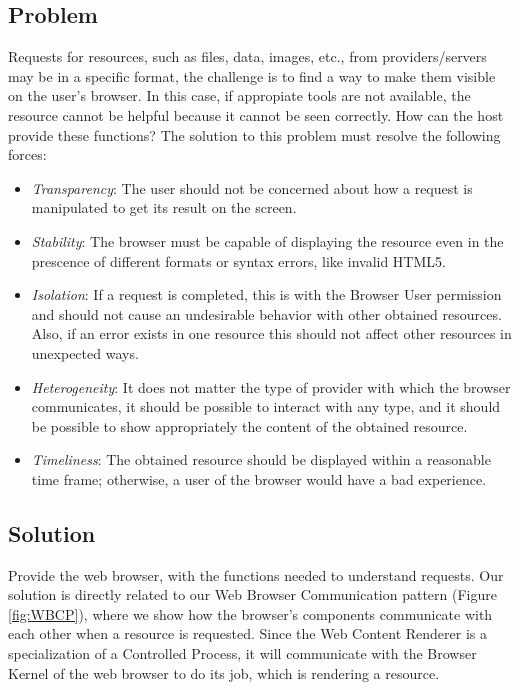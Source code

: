 \documentclass[prodmode,acmtecs]{acmsmall}
\begin{document}
  \subsection*{Problem}
  Requests for resources, such as files, data, images, etc., from providers/servers may be in a specific format, the challenge is to find a way to make them visible on the user's browser. In this case, if appropiate tools are not available, the resource cannot be helpful because it cannot be seen correctly. How can the host provide these functions? The solution to this problem must resolve the following forces:
  \begin{itemize}\leftskip0.8em
    \item \textit{Transparency}: The user should not be concerned about how a request is manipulated to get its result on the screen.
    \item \textit{Stability}: The browser must be capable of displaying the resource even in the prescence of different formats or syntax errors, like invalid HTML5.
    \item \textit{Isolation}: If a request is completed, this is with the Browser User permission and should not cause an undesirable behavior with other obtained resources. Also, if an error exists in one resource this should not affect other resources in unexpected ways.
    \item \textit{Heterogeneity}: It does not matter the type of provider with which the browser communicates, it should be possible to interact with any type, and it should be possible to show appropriately the content of the obtained resource.
    \item \textit{Timeliness}: The obtained resource should be displayed within a reasonable time frame; otherwise, a user of the browser would have a bad experience.
  \end{itemize}

  \subsection*{Solution}
  Provide the web browser, with the functions needed to understand requests. Our solution is directly related to our Web Browser Communication pattern \cite{silva2015} (Figure \ref{fig:WBCP}), where we show how the browser's components communicate with each other when a resource is requested. Since the Web Content Renderer is a specialization of a Controlled Process, it will communicate with the Browser Kernel of the web browser to do its job, which is rendering a resource.
\end{document}
